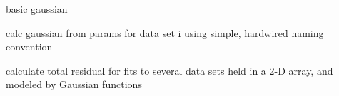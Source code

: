 \documentclass[letterpaper,10pt,english]{sphinxmanual}
\begin{document}
\begin{fulllineitems}
\label{\detokenize{platelib:platelib.fitfun.gauss}}
basic gaussian

\end{fulllineitems}


\begin{fulllineitems}
\label{\detokenize{platelib:platelib.fitfun.gauss_dataset}}
calc gaussian from params for data set i
using simple, hardwired naming convention

\end{fulllineitems}


\begin{fulllineitems}
\label{\detokenize{platelib:platelib.fitfun.linear}}
\end{fulllineitems}


\begin{fulllineitems}
\label{\detokenize{platelib:platelib.fitfun.objective}}
calculate total residual for fits to several data sets held
in a 2-D array, and modeled by Gaussian functions

\end{fulllineitems}


\begin{fulllineitems}
\label{\detokenize{platelib:platelib.fitfun.quadratic}}
\end{fulllineitems}

\end{document}
